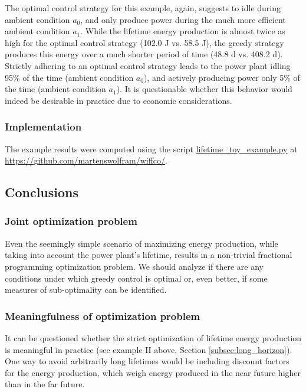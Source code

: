 \documentclass{article}
\begin{document}
    The optimal control strategy for this example, again, suggests to idle during ambient condition $a_0$, and only produce power during the much more efficient ambient condition $a_1$. While the lifetime energy production is almost twice as high for the optimal control strategy (102.0 J vs. 58.5 J), the greedy strategy produces this energy over a much shorter period of time (48.8 d vs. 408.2 d). Strictly adhering to an optimal control strategy leads to the power plant idling 95\% of the time (ambient condition $a_0$), and actively producing power only 5\% of the time (ambient condition $a_1$). It is questionable whether this behavior would indeed be desirable in practice due to economic considerations.
   
    \subsubsection{Implementation}
    The example results were computed using the script \href{https://github.com/martenswolfram/wiffco/tree/devel/documentation/lifetime_energy_production/lifetime_toy_example.py}{lifetime\_toy\_example.py} at \url{https://github.com/martenswolfram/wiffco/}.

    \subsection{Conclusions}
    
    \subsubsection{Joint optimization problem}
    Even the seemingly simple scenario of maximizing energy production, while taking into account the power plant's lifetime, results in a non-trivial fractional programming optimization problem. We should analyze if there are any conditions under which greedy control is optimal or, even better, if some measures of sub-optimality can be identified.
    
    \subsubsection{Meaningfulness of optimization problem}
    It can be questioned whether the strict optimization of lifetime energy production is meaningful in practice (see example II above, Section \ref{subsec:long_horizon}). One way to avoid arbitrarily long lifetimes would be including discount factors for the energy production, which weigh energy produced in the near future higher than in the far future.
    
\end{document}
